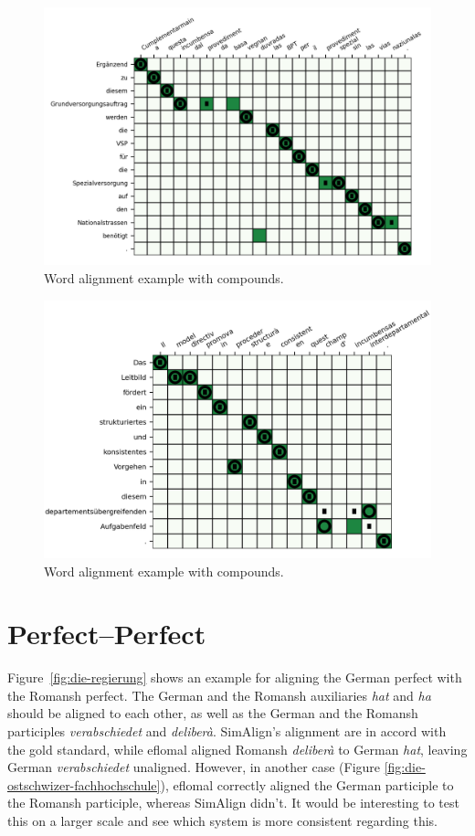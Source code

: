 \begin{figure}
	\includegraphics{graphics/alignments/compounds1.png}
	\caption{Word alignment example with compounds.}
	\label{fig:ergaenzend}
\end{figure}

\begin{figure}
	\includegraphics{graphics/alignments/compounds2.png}
	\caption{Word alignment example with compounds.}
	\label{fig:das-leitbild}
\end{figure}




\section{Perfect--Perfect}\label{sec:perfect-perfect}
Figure~\ref{fig:die-regierung} shows an example for aligning the German perfect with the Romansh perfect. 
The German and the Romansh auxiliaries \emph{hat} and \emph{ha} should be aligned to each other, as well as the German and the Romansh participles \emph{verabschiedet} and \emph{deliberà}. 
SimAlign's alignment are in accord with the gold standard, while eflomal aligned Romansh \emph{deliberà} to German \emph{hat}, leaving German \emph{verabschiedet} unaligned. However, in another case (Figure \ref{fig:die-ostschwizer-fachhochschule}), eflomal correctly aligned the German participle to the Romansh participle, whereas SimAlign didn't. 
It would be interesting to test this on a larger scale and see which system is more consistent regarding this.

